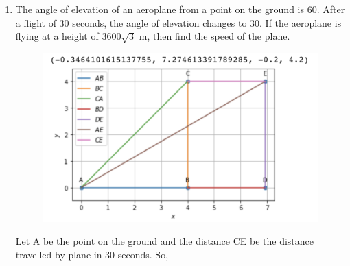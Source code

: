 \documentclass[journal,12pt,twocolumn]{IEEEtran}
\renewcommand\thesection{\arabic{section}}
\begin{document}
\begin{enumerate}[label=\thesection.\arabic*.,ref=\thesection.\theenumi]
\item The angle of elevation of an aeroplane from a point on the ground is 60\textdegree. After a flight of 30 seconds, the angle of elevation changes to 30\textdegree. If the aeroplane is flying at a height of 3600$\sqrt{3}$ m, then find the speed of the plane.\\
\begin{table}[ht]
 \centering
 \caption{}
 \end{table} 

 \begin{figure}
	  \centering 
	  \includegraphics[width=\columnwidth]{4.2}
	  \caption{}
	  \label{fig:geometry-3.9.pdf}
 \end{figure}

\solution Let A be the point on the ground and the distance CE be the distance travelled by plane in 30 seconds. So,\\


\end{enumerate}
\end{document}
